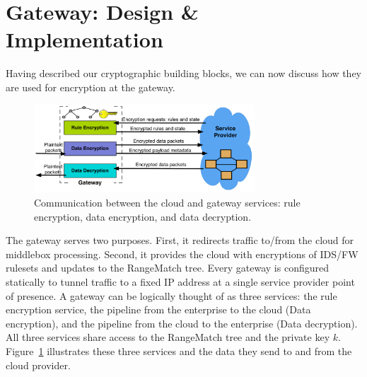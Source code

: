\section{Gateway: Design \& Implementation}

\label{sec:gateway}
Having described our cryptographic building blocks, we can now discuss how they are used for encryption at the gateway.

\begin{figure}[t]
  \centering
  \includegraphics[width=3.25in]{fig/gateway2cloud}
  \caption[]{\label{fig:gatewaymeta} Communication between the cloud and gateway services: rule encryption, data encryption, and data decryption. }
\end{figure}



The gateway serves two purposes. First, it redirects traffic to/from the cloud for middlebox processing. Second, it provides the cloud with encryptions of IDS/FW rulesets and updates to the RangeMatch tree.
Every gateway is configured statically to tunnel traffic to a fixed IP address at a single service provider point of presence.
A gateway can be logically thought of as three services: the rule encryption service, the pipeline from the enterprise to the cloud (Data encryption), and the pipeline from the cloud to the enterprise (Data decryption). 
All three services share access to the RangeMatch tree and the private key $k$.
Figure~\ref{fig:gatewaymeta} illustrates  these three services and the data they send to and from the cloud provider.

